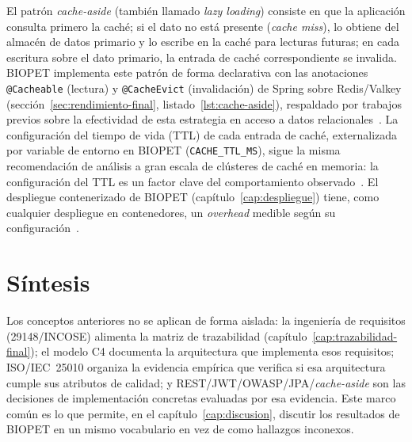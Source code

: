 El patr\'on \emph{cache-aside} (tambi\'en llamado \emph{lazy loading})
consiste en que la aplicaci\'on consulta primero la cach\'e; si el dato no
est\'a presente (\emph{cache miss}), lo obtiene del almac\'en de datos
primario y lo escribe en la cach\'e para lecturas futuras; en cada
escritura sobre el dato primario, la entrada de cach\'e correspondiente se
invalida. BIOPET implementa este patr\'on de forma declarativa con las
anotaciones \texttt{@Cacheable} (lectura) y \texttt{@CacheEvict}
(invalidaci\'on) de Spring sobre Redis/Valkey
(secci\'on~\ref{sec:rendimiento-final}, listado~\ref{lst:cache-aside}),
respaldado por trabajos previos sobre la efectividad de esta estrategia en
acceso a datos relacionales~\cite{zulfa2020caching}. La configuraci\'on
del tiempo de vida (TTL) de cada entrada de cach\'e, externalizada por
variable de entorno en BIOPET (\texttt{CACHE\_TTL\_MS}), sigue la misma
recomendaci\'on de an\'alisis a gran escala de cl\'usteres de cach\'e en
memoria: la configuraci\'on del TTL es un factor clave del comportamiento
observado~\cite{yang2021large}. El despliegue contenerizado de BIOPET
(cap\'itulo~\ref{cap:despliegue}) tiene, como cualquier despliegue en
contenedores, un \emph{overhead} medible seg\'un su
configuraci\'on~\cite{ghatrehsamani2020art}.

\section{S\'intesis}

Los conceptos anteriores no se aplican de forma aislada: la ingenier\'ia
de requisitos (29148/INCOSE) alimenta la matriz de trazabilidad
(cap\'itulo~\ref{cap:trazabilidad-final}); el modelo C4 documenta la
arquitectura que implementa esos requisitos; ISO/IEC~25010 organiza la
evidencia emp\'irica que verifica si esa arquitectura cumple sus atributos
de calidad; y REST/JWT/OWASP/JPA/\emph{cache-aside} son las decisiones de
implementaci\'on concretas evaluadas por esa evidencia. Este marco
com\'un es lo que permite, en el cap\'itulo~\ref{cap:discusion}, discutir
los resultados de BIOPET en un mismo vocabulario en vez de como hallazgos
inconexos.
